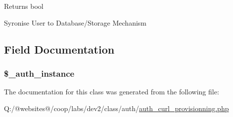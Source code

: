 \begin{DoxyReturn}{Returns}
bool 
\end{DoxyReturn}
Syronise User to Database/\-Storage Mechanism

\subsection{Field Documentation}
\hypertarget{class_xortify_auth_curl_provisionning_a486ed878bb5a7188c99ac4c9ee46ac6e}{
\subsubsection[{\$\-\_\-auth\-\_\-instance}]{\setlength{\rightskip}{0pt plus 5cm}\$\-\_\-auth\-\_\-instance}}\label{class_xortify_auth_curl_provisionning_a486ed878bb5a7188c99ac4c9ee46ac6e}


The documentation for this class was generated from the following file\-:\begin{DoxyCompactItemize}
\item 
Q\-:/@websites@/coop/labs/dev2/class/auth/\hyperlink{auth__curl__provisionning_8php}{auth\-\_\-curl\-\_\-provisionning.\-php}\end{DoxyCompactItemize}
